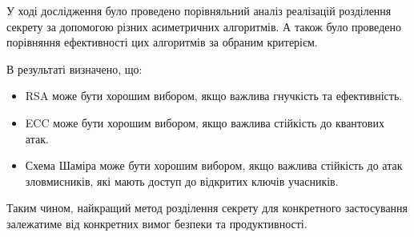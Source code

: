 
У ході дослідження було проведено порівняльний аналіз реалізацій розділення секрету за допомогою різних асиметричних алгоритмів. А також було проведено порівняння ефективності цих алгоритмів за обраним критерієм.

В результаті визначено, що:
\begin{itemize}
\item RSA може бути хорошим вибором, якщо важлива гнучкість та ефективність.
\item ECC може бути хорошим вибором, якщо важлива стійкість до квантових атак.
\item Схема Шаміра може бути хорошим вибором, якщо важлива стійкість до атак зловмисників, які мають доступ до відкритих ключів учасників.
\end{itemize}

Таким чином, найкращий метод розділення секрету для конкретного застосування залежатиме від конкретних вимог безпеки та продуктивності.